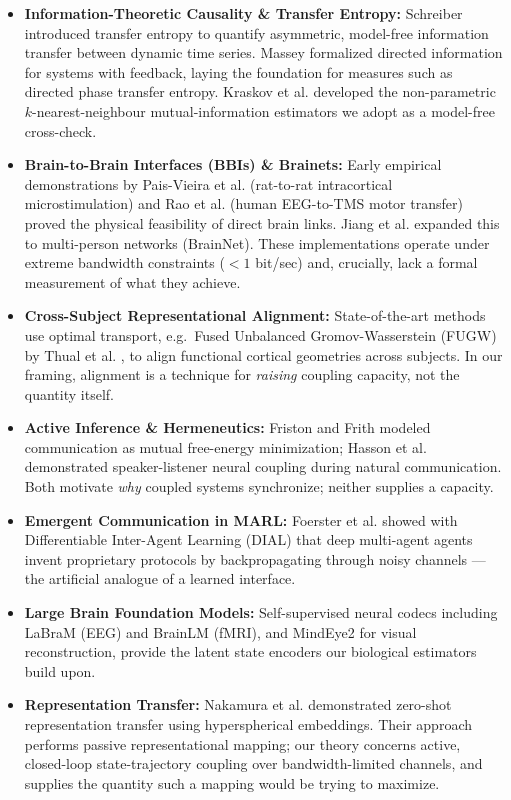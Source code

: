\documentclass[11pt]{article}
\begin{document}
\begin{itemize}[leftmargin=1.2em]
    \item \textbf{Information-Theoretic Causality \& Transfer Entropy:} Schreiber \cite{schreiber2000measuring} introduced transfer entropy to quantify asymmetric, model-free information transfer between dynamic time series. Massey \cite{massey1990causality} formalized directed information for systems with feedback, laying the foundation for measures such as directed phase transfer entropy. Kraskov et al. \cite{kraskov2004estimating} developed the non-parametric $k$-nearest-neighbour mutual-information estimators we adopt as a model-free cross-check.
    \item \textbf{Brain-to-Brain Interfaces (BBIs) \& Brainets:} Early empirical demonstrations by Pais-Vieira et al. \cite{pais2013brain} (rat-to-rat intracortical microstimulation) and Rao et al. \cite{rao2014direct} (human EEG-to-TMS motor transfer) proved the physical feasibility of direct brain links. Jiang et al. \cite{jiang2019brainnet} expanded this to multi-person networks (BrainNet). These implementations operate under extreme bandwidth constraints ($<1$ bit/sec) and, crucially, lack a formal measurement of what they achieve.
    \item \textbf{Cross-Subject Representational Alignment:} State-of-the-art methods use optimal transport, e.g.\ Fused Unbalanced Gromov-Wasserstein (FUGW) by Thual et al. \cite{thual2022aligning}, to align functional cortical geometries across subjects. In our framing, alignment is a technique for \emph{raising} coupling capacity, not the quantity itself.
    \item \textbf{Active Inference \& Hermeneutics:} Friston and Frith \cite{friston2015active} modeled communication as mutual free-energy minimization; Hasson et al. \cite{hasson2010speaker} demonstrated speaker-listener neural coupling during natural communication. Both motivate \emph{why} coupled systems synchronize; neither supplies a capacity.
    \item \textbf{Emergent Communication in MARL:} Foerster et al. \cite{foerster2016learning} showed with Differentiable Inter-Agent Learning (DIAL) that deep multi-agent agents invent proprietary protocols by backpropagating through noisy channels --- the artificial analogue of a learned interface.
    \item \textbf{Large Brain Foundation Models:} Self-supervised neural codecs including LaBraM \cite{jiang2024labram} (EEG) and BrainLM \cite{caro2024brainlm} (fMRI), and MindEye2 \cite{scotti2024mindeye2} for visual reconstruction, provide the latent state encoders our biological estimators build upon.
    \item \textbf{Representation Transfer:} Nakamura et al. \cite{nakamura2024unsupervised} demonstrated zero-shot representation transfer using hyperspherical embeddings. Their approach performs passive representational mapping; our theory concerns active, closed-loop state-trajectory coupling over bandwidth-limited channels, and supplies the quantity such a mapping would be trying to maximize.
\end{itemize}
\end{document}
